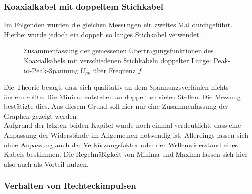 	
	


	\subsubsection{Koaxialkabel mit doppeltem Stichkabel} %
	\label{ssub:koaxialkabel_mit_doppeltem_stichkabel}

		Im Folgenden wurden die gleichen Messungen ein zweites Mal durchgeführt.
		Hierbei wurde jedoch ein doppelt so langes Stichkabel verwendet.

		\begin{figure}[H]
			\center
			
			\caption{\centering Zusammenfassung der gemessenen Übertragungsfunktionen des Koaxialkabels mit verschiedenen Stichkabeln doppelter Länge: Peak-to-Peak-Spannung $U_{pp}$ über Frequenz $f$} %
			\label{diagramm_stichkabel2}
		\end{figure}

		Die Theorie besagt, dass sich qualitativ an dem Spannungsverläufen nichts ändern sollte.
		Die Minima entstehen an doppelt so vielen Stellen.
		Die Messung bestätigte dies.
		Aus diesem Grund soll hier nur eine Zusammenfassung der Graphen gezeigt werden. \\

		Aufgrund der letzten beiden Kapitel wurde noch einmal verdeutlicht, dass eine Anpassung der Widerstände im Allgemeinen notwendig ist.
		Allerdings lassen sich ohne Anpassung auch der Verkürzungsfaktor oder der Wellenwiderstand eines Kabels bestimmen.
		Die Regelmäßigkeit von Minima und Maxima lassen sich hier also auch als Vorteil nutzen.
	

	\subsubsection{Verhalten von Rechteckimpulsen} %
	\label{ssub:verhalten_von_rechteckimpulsen}
	
